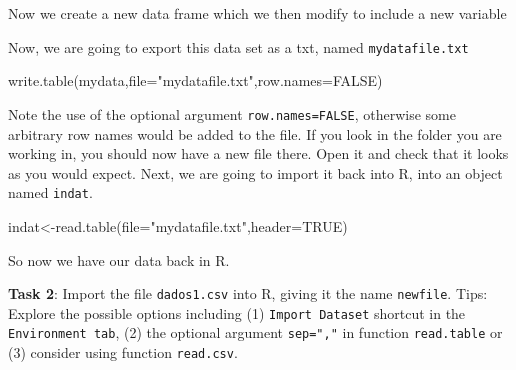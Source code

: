 \documentclass[
]{article}
\newenvironment{Shaded}{\begin{snugshade}}{\end{snugshade}}
\newcommand{\AttributeTok}[1]{\textcolor[rgb]{0.77,0.63,0.00}{#1}}
\newcommand{\ConstantTok}[1]{\textcolor[rgb]{0.00,0.00,0.00}{#1}}
\newcommand{\FunctionTok}[1]{\textcolor[rgb]{0.00,0.00,0.00}{#1}}
\newcommand{\NormalTok}[1]{#1}
\newcommand{\OtherTok}[1]{\textcolor[rgb]{0.56,0.35,0.01}{#1}}
\newcommand{\SpecialCharTok}[1]{\textcolor[rgb]{0.00,0.00,0.00}{#1}}
\newcommand{\StringTok}[1]{\textcolor[rgb]{0.31,0.60,0.02}{#1}}
\begin{document}
Now we create a new data frame which we then modify to include a new
variable

\begin{Shaded}
\end{Shaded}

Now, we are going to export this data set as a txt, named
\texttt{mydatafile.txt}

\begin{Shaded}
\begin{Highlighting}[]
\FunctionTok{write.table}\NormalTok{(mydata,}\AttributeTok{file=}\StringTok{"mydatafile.txt"}\NormalTok{,}\AttributeTok{row.names=}\ConstantTok{FALSE}\NormalTok{)}
\end{Highlighting}
\end{Shaded}

Note the use of the optional argument \texttt{row.names=FALSE},
otherwise some arbitrary row names would be added to the file. If you
look in the folder you are working in, you should now have a new file
there. Open it and check that it looks as you would expect. Next, we are
going to import it back into R, into an object named \texttt{indat}.

\begin{Shaded}
\begin{Highlighting}[]
\NormalTok{indat}\OtherTok{\textless{}{-}}\FunctionTok{read.table}\NormalTok{(}\AttributeTok{file=}\StringTok{"mydatafile.txt"}\NormalTok{,}\AttributeTok{header=}\ConstantTok{TRUE}\NormalTok{)}
\end{Highlighting}
\end{Shaded}

So now we have our data back in R.

\textbf{Task 2}: Import the file \texttt{dados1.csv} into R, giving it
the name \texttt{newfile}. Tips: Explore the possible options including
(1) \texttt{Import\ Dataset} shortcut in the \texttt{Environment\ tab},
(2) the optional argument \texttt{sep=","} in function
\texttt{read.table} or (3) consider using function \texttt{read.csv}.
\end{document}
